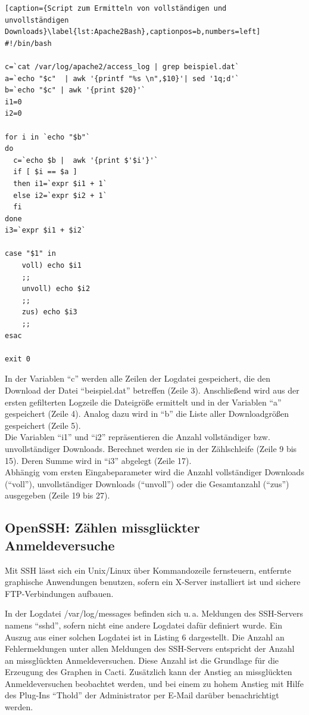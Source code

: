 \documentclass[12pt,ngerman,toc=listofnumbered,toc=bibliographynumbered,toc=index,headsepline=true]{scrbook}
\begin{document}
\begin{lstlisting}[caption={Script zum Ermitteln von vollständigen und
unvollständigen Downloads}\label{lst:Apache2Bash},captionpos=b,numbers=left]
#!/bin/bash

c=`cat /var/log/apache2/access_log | grep beispiel.dat`
a=`echo "$c"  | awk '{printf "%s \n",$10}'| sed '1q;d'`
b=`echo "$c" | awk '{print $20}'`
i1=0
i2=0

for i in `echo "$b"`
do
  c=`echo $b |  awk '{print $'$i'}'`
  if [ $i == $a ]
  then i1=`expr $i1 + 1`
  else i2=`expr $i2 + 1`
  fi
done
i3=`expr $i1 + $i2`

case "$1" in
    voll) echo $i1
    ;;
    unvoll) echo $i2
    ;;
    zus) echo $i3
    ;;
esac

exit 0
\end{lstlisting}
In der Variablen \enquote{c} werden alle Zeilen der Logdatei gespeichert, die
den Download der Datei \enquote{beispiel.dat} betreffen (Zeile 3). Anschließend
wird aus der ersten gefilterten Logzeile die Dateigröße ermittelt und in der
Variablen \enquote{a} gespeichert (Zeile 4). Analog dazu wird in \enquote{b} die
Liste aller Downloadgrößen gespeichert (Zeile 5).\\
Die Variablen \enquote{i1} und \enquote{i2} repräsentieren die Anzahl
vollständiger bzw. unvollständiger Downloads. Berechnet werden sie in der
Zählschleife (Zeile 9 bis 15). Deren Summe wird in \enquote{i3} abgelegt (Zeile
17).\\
Abhängig vom ersten Eingabeparameter wird die Anzahl vollständiger Downloads
(\enquote{voll}), unvollständiger Downloads (\enquote{unvoll}) oder die
Gesamtanzahl (\enquote{zus}) ausgegeben (Zeile 19 bis 27).

\subsection{OpenSSH: Zählen missglückter Anmeldeversuche}
Mit SSH lässt sich ein Unix/Linux über Kommandozeile fernsteuern, entfernte
graphische Anwendungen benutzen, sofern ein X-Server installiert ist und sichere
FTP-Verbindungen aufbauen.

In der Logdatei /var/log/messages befinden sich u.\,a. Meldungen des SSH-Servers
namens \enquote{sshd}, sofern nicht eine andere Logdatei dafür definiert wurde.
Ein Auszug aus einer solchen Logdatei ist in Listing 6
dargestellt. Die Anzahl an Fehlermeldungen unter allen Meldungen des SSH-Servers
entspricht der Anzahl an missglückten Anmeldeversuchen. Diese Anzahl ist die
Grundlage für die Erzeugung des Graphen in Cacti. Zusätzlich kann der Anstieg an
missglückten Anmeldeversuchen beobachtet werden, und bei einem zu hohem Anstieg
mit Hilfe des Plug-Ins \enquote{Thold} der Administrator per E-Mail darüber
benachrichtigt werden.
\end{document}

